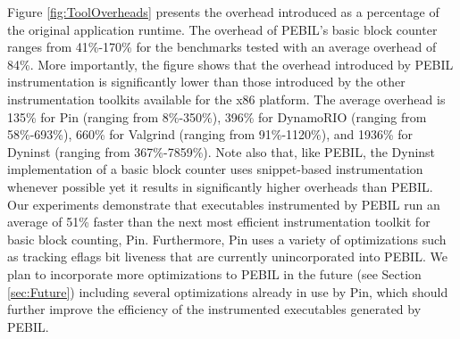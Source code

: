 Figure \ref{fig:ToolOverheads} presents the overhead introduced as a percentage
of the original application runtime. The overhead of PEBIL's basic block counter
ranges from 41\%-170\% for the benchmarks tested with an average overhead of
84\%. More importantly, the figure shows that the overhead introduced by PEBIL
instrumentation is significantly lower than those introduced by the other
instrumentation toolkits available for the x86 platform. The average overhead is
135\% for Pin (ranging from 8\%-350\%), 396\% for DynamoRIO (ranging from
58\%-693\%), 660\% for Valgrind (ranging from 91\%-1120\%), and 1936\% for
Dyninst (ranging from 367\%-7859\%). Note also that, like PEBIL, the Dyninst
implementation of a basic block counter uses snippet-based instrumentation
whenever possible yet it results in significantly higher overheads than PEBIL.
Our experiments demonstrate that executables instrumented by PEBIL run an
average of 51\% faster than the next most efficient instrumentation toolkit for
basic block counting, Pin. Furthermore, Pin uses a variety of optimizations such
as tracking eflags bit liveness \cite{luk2005pin} that are currently
unincorporated into PEBIL. We plan to incorporate more optimizations to PEBIL in
the future (see Section \ref{sec:Future}) including several optimizations
already in use by Pin, which should further improve the efficiency of the
instrumented executables generated by PEBIL.

